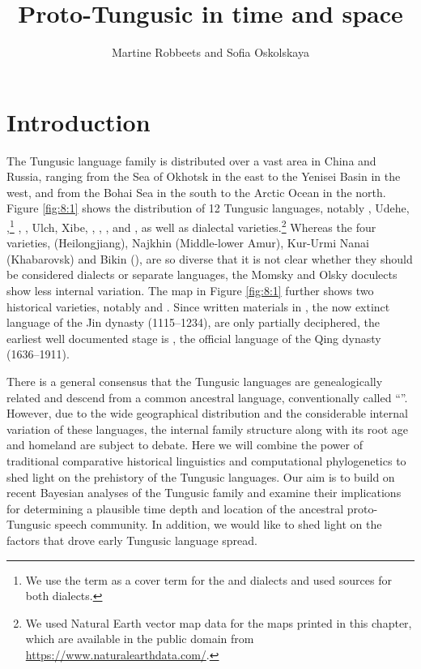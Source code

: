 \documentclass[output=paper,colorlinks,citecolor=brown]{langscibook}
\author{Martine Robbeets\affiliation{Max Planck Institute for the Science of Human History \& Johannes Gutenberg Universität Mainz} and Sofia Oskolskaya\affiliation{Institute for Linguistic Studies, Russian Academy of Sciences}}
\title{Proto-Tungusic in time and space}
\begin{document}
\maketitle

\section{Introduction}\largerpage

The Tungusic language family is distributed over a vast area in China and Russia, ranging from the Sea of Okhotsk in the east to the Yenisei Basin in the west, and from the Bohai Sea in the south to the Arctic Ocean in the north. Figure \ref{fig:8:1} shows the distribution of 12 Tungusic languages, notably , Udehe, ,\footnote{We use the term \textit{} as a cover term for the  and  dialects and used sources for both dialects.} , , Ulch, Xibe, , , ,  and , as well as dialectal varieties.\footnote{We used Natural Earth vector map data for the maps printed in this chapter, which are available in the public domain from \url{https://www.naturalearthdata.com/}.} Whereas the four  varieties,  (Heilongjiang), Najkhin  (Middle-lower Amur), Kur-Urmi Nanai (Khabarovsk) and Bikin  (), are so diverse that it is not clear whether they should be considered dialects or separate languages, the Momsky and Olsky  doculects show less internal variation. The map in Figure \ref{fig:8:1} further shows two historical varieties, notably  and . Since written materials in , the now extinct language of the Jin dynasty (1115--1234), are only partially deciphered, the earliest well documented stage is , the official language of the Qing dynasty (1636--1911).

There is a general consensus that the Tungusic languages are genealogically related and descend from a common ancestral language, conventionally called “”. However, due to the wide geographical distribution and the considerable internal variation of these languages, the internal family structure along with its root age and homeland are subject to debate. Here we will combine the power of traditional comparative historical linguistics and computational phylogenetics to shed light on the prehistory of the Tungusic languages. Our aim is to build on recent Bayesian analyses of the Tungusic family and examine their implications for determining a plausible time depth and location of the ancestral proto-Tungusic speech community. In addition, we would like to shed light on the factors that drove early Tungusic language spread.
\end{document}
